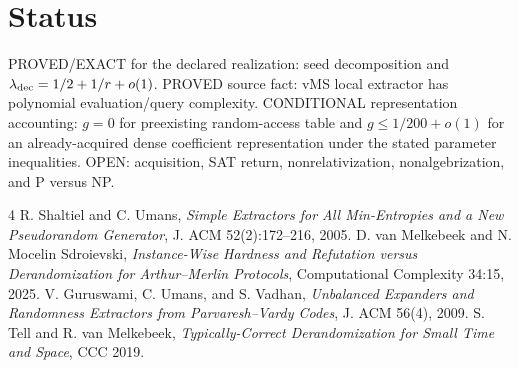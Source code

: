 \documentclass[11pt]{article}
\begin{document}
\section*{Status}
PROVED/EXACT for the declared realization: seed decomposition and $\lambda_{\rm dec}=1/2+1/r+o(1)$. PROVED source fact: vMS local extractor has polynomial evaluation/query complexity. CONDITIONAL representation accounting: $g=0$ for preexisting random-access table and $g\le1/200+o(1)$ for an already-acquired dense coefficient representation under the stated parameter inequalities. OPEN: acquisition, SAT return, nonrelativization, nonalgebrization, and P versus NP.
\begin{thebibliography}{4}
 R. Shaltiel and C. Umans, \emph{Simple Extractors for All Min-Entropies and a New Pseudorandom Generator}, J. ACM 52(2):172--216, 2005.
 D. van Melkebeek and N. Mocelin Sdroievski, \emph{Instance-Wise Hardness and Refutation versus Derandomization for Arthur--Merlin Protocols}, Computational Complexity 34:15, 2025.
 V. Guruswami, C. Umans, and S. Vadhan, \emph{Unbalanced Expanders and Randomness Extractors from Parvaresh--Vardy Codes}, J. ACM 56(4), 2009.
 S. Tell and R. van Melkebeek, \emph{Typically-Correct Derandomization for Small Time and Space}, CCC 2019.
\end{thebibliography}
\end{document}
